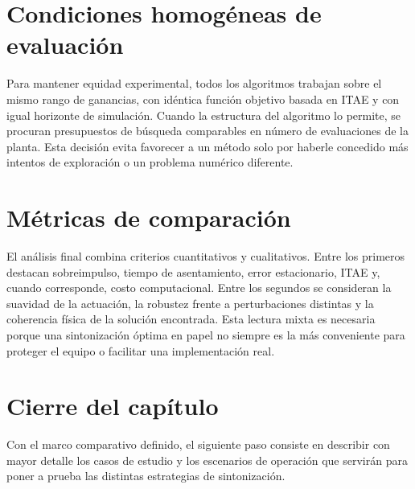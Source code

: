 \section{Condiciones homogéneas de evaluación}
Para mantener equidad experimental, todos los algoritmos trabajan sobre el mismo rango de
ganancias, con idéntica función objetivo basada en ITAE y con igual horizonte de simulación.
Cuando la estructura del algoritmo lo permite, se procuran presupuestos de búsqueda
comparables en número de evaluaciones de la planta. Esta decisión evita favorecer a un método
solo por haberle concedido más intentos de exploración o un problema numérico diferente.

\section{Métricas de comparación}
El análisis final combina criterios cuantitativos y cualitativos. Entre los primeros destacan
sobreimpulso, tiempo de asentamiento, error estacionario, ITAE y, cuando corresponde, costo
computacional. Entre los segundos se consideran la suavidad de la actuación, la robustez frente
a perturbaciones distintas y la coherencia física de la solución encontrada. Esta lectura mixta es
necesaria porque una sintonización óptima en papel no siempre es la más conveniente para
proteger el equipo o facilitar una implementación real.

\section{Cierre del capítulo}
Con el marco comparativo definido, el siguiente paso consiste en describir con mayor detalle los
casos de estudio y los escenarios de operación que servirán para poner a prueba las distintas
estrategias de sintonización.
